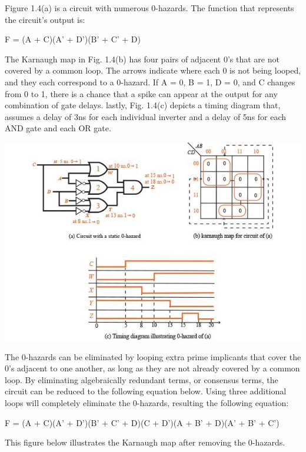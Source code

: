 \documentclass[12pt]{article}
\begin{document}
Figure 1.4(a) is a circuit with numerous 0-hazards. The function that represents the circuit's output is:

F  = (A + C)(A' + D')(B' + C' + D)


The Karnaugh map in Fig. 1.4(b) has four pairs of adjacent 0's that are not covered by a common loop. The arrows indicate where each 0 is not being looped, and they each correspond to a 0-hazard. If A = 0, B = 1, D = 0, and C changes from 0 to 1, there is a chance that a spike can appear at the output for any combination of gate delays. lastly, Fig. 1.4(c) depicts a timing diagram that, assumes a delay of 3ns for each individual inverter and a delay of 5ns for each AND gate and each OR gate.



\begin{center}
	\includegraphics[scale=0.8]{./Figure-1-4-static-hazard-diagrams.jpg}
\end{center}


The 0-hazards can be eliminated by looping extra prime implicants that cover the 0's adjacent to one another, as long as they are not already covered by a common loop. By eliminating algebraically redundant terms, or consensus terms, the circuit can be reduced to the following equation below. Using three additional loops will completely eliminate the 0-hazards, resulting the following equation: 


F = (A + C)(A' + D')(B' + C' + D)(C + D')(A + B' + D)(A' + B' + C')


This figure below illustrates the Karnaugh map after removing the 0-hazards. 
\end{document}
